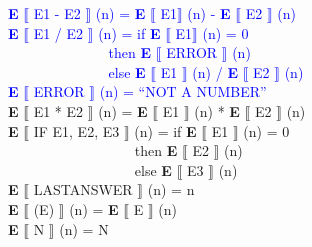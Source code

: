 \textcolor{blue}{\textbf{E} $\llbracket$ E1 - E2 $\rrbracket$ (n) = \textbf{E} $\llbracket$ E1$\rrbracket$ (n) - \textbf{E} $\llbracket$ E2 $\rrbracket$ (n)} \\
\textcolor{blue}{\textbf{E} $\llbracket$ E1 / E2 $\rrbracket$ (n) = if \textbf{E} $\llbracket$ E1$\rrbracket$ (n) = 0\\
$~~~~~~~~~~~~~~~~~~~~~~~~~~~~~~~$ then \textbf{E} $\llbracket$ ERROR $\rrbracket$ (n) \\
$~~~~~~~~~~~~~~~~~~~~~~~~~~~~~~~$ else \textbf{E} $\llbracket$ E1 $\rrbracket$ (n) / \textbf{E} $\llbracket$ E2 $\rrbracket$ (n) \\
\textbf{E} $\llbracket$ ERROR $\rrbracket$ (n) = ``NOT A NUMBER''}\\
\textbf{E} $\llbracket$ E1 * E2 $\rrbracket$ (n) = \textbf{E} $\llbracket$ E1 $\rrbracket$ (n) * \textbf{E} $\llbracket$ E2 $\rrbracket$ (n) \\
\textbf{E} $\llbracket$ IF E1, E2, E3 $\rrbracket$ (n) = if \textbf{E} $\llbracket$ E1 $\rrbracket$ (n) = 0 \\
$~~~~~~~~~~~~~~~~~~~~~~~~~~~~~~~~~~~~~~~~~$then \textbf{E} $\llbracket$ E2 $\rrbracket$ (n) \\
$~~~~~~~~~~~~~~~~~~~~~~~~~~~~~~~~~~~~~~~~~$else \textbf{E} $\llbracket$ E3 $\rrbracket$ (n) \\
\textbf{E} $\llbracket$ LASTANSWER $\rrbracket$ (n) = n \\
\textbf{E} $\llbracket$ (E) $\rrbracket$ (n) = \textbf{E} $\llbracket$ E $\rrbracket$ (n) \\
\textbf{E} $\llbracket$ N $\rrbracket$ (n) = N \\